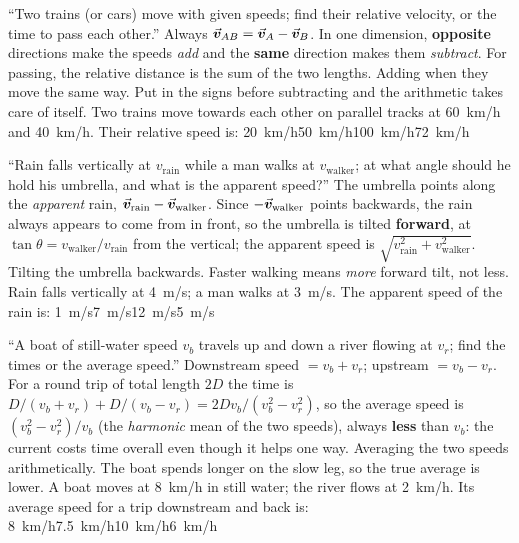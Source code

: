 {``Two trains (or cars) move with given speeds; find their relative velocity, or the time to pass each
other.''}
{Always $\vec{\bm{v}}_{AB}=\vec{\bm{v}}_A-\vec{\bm{v}}_B$. In one dimension, \textbf{opposite} directions make the speeds
\emph{add} and the \textbf{same} direction makes them \emph{subtract}. For passing, the relative distance
is the sum of the two lengths.}
{Adding when they move the same way. Put in the signs before subtracting and the arithmetic takes care
of itself.}
{Two trains move towards each other on parallel tracks at \SI{60}{km/h} and \SI{40}{km/h}. Their relative speed is:}
{\SI{20}{km/h}}{\SI{50}{km/h}}{\SI{100}{km/h}}{\SI{72}{km/h}}

{``Rain falls vertically at $v_{\text{rain}}$ while a man walks at $v_{\text{walker}}$; at what angle
should he hold his umbrella, and what is the apparent speed?''}
{The umbrella points along the \emph{apparent} rain, $\vec{\bm{v}}_{\text{rain}}-\vec{\bm{v}}_{\text{walker}}$. Since
$-\vec{\bm{v}}_{\text{walker}}$ points backwards, the rain always appears to come from in front, so the umbrella
is tilted \textbf{forward}, at $\tan\theta=v_{\text{walker}}/v_{\text{rain}}$ from the vertical; the
apparent speed is $\sqrt{v_{\text{rain}}^2+v_{\text{walker}}^2}$.}
{Tilting the umbrella backwards. Faster walking means \emph{more} forward tilt, not less.}
{Rain falls vertically at \SI{4}{m/s}; a man walks at \SI{3}{m/s}. The apparent speed of the rain is:}
{\SI{1}{m/s}}{\SI{7}{m/s}}{\SI{12}{m/s}}{\SI{5}{m/s}}

{``A boat of still-water speed $v_b$ travels up and down a river flowing at $v_r$; find the times or
the average speed.''}
{Downstream speed $=v_b+v_r$; upstream $=v_b-v_r$. For a round trip of total length $2D$ the time is
$D/(v_b+v_r)+D/(v_b-v_r)=2Dv_b/(v_b^2-v_r^2)$, so the average speed is $(v_b^2-v_r^2)/v_b$ (the
\emph{harmonic} mean of the two speeds), always \textbf{less} than $v_b$: the current costs time
overall even though it helps one way.}
{Averaging the two speeds arithmetically. The boat spends longer on the slow leg, so the true average is
lower.}
{A boat moves at \SI{8}{km/h} in still water; the river flows at \SI{2}{km/h}. Its average speed for a
trip downstream and back is:}
{\SI{8}{km/h}}{\SI{7.5}{km/h}}{\SI{10}{km/h}}{\SI{6}{km/h}}

